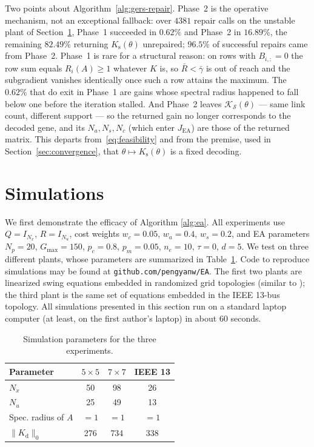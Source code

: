 \documentclass[letterpaper, 10pt, conference]{ieeeconf}
\begin{document}
Two points about Algorithm~\ref{alg:gers-repair}. Phase~2 is the operative
mechanism, not an exceptional fallback: over $4381$ repair calls on the unstable
plant of Section~\ref{sec:simulations}, Phase~1 succeeded in $0.62\%$ and
Phase~2 in $16.89\%$, the remaining $82.49\%$ returning $K_\mathrm{s}(\theta)$
unrepaired; $96.5\%$ of successful repairs came from Phase~2. Phase~1 is rare for a
structural reason: on rows with $B_{i,:}=0$ the row sum equals $R_i(A)\ge 1$
whatever $K$ is, so $\bar{R}<\bar{\gamma}$ is out of reach and the subgradient
vanishes identically once such a row attains the maximum. The $0.62\%$ that do
exit in Phase~1 are gains whose spectral radius happened to fall below one
before the iteration stalled. And Phase~2 leaves
$\mathcal{K}_{\mathcal{S}}(\theta)$ --- same link count, different support --- so
the returned gain no longer corresponds to the decoded gene, and its
$N_a,N_s,N_c$ (which enter $J_\mathrm{EA}$) are those of the returned matrix.
This departs from~\eqref{eq:feasibility} and from the premise, used in
Section~\ref{sec:convergence}, that $\theta\mapsto K_\mathrm{s}(\theta)$ is a
fixed decoding.

\section{Simulations} \label{sec:simulations}
We first demonstrate the efficacy of Algorithm \ref{alg:ea}. All experiments use $Q = I_{N_x}$, $R = I_{N_u}$, cost weights $w_c = 0.05$, $w_a = 0.4$, $w_s = 0.2$, and EA parameters $N_p = 20$, $G_{\max} = 150$, $p_c = 0.8$,
$p_m = 0.05$, $n_e = 10$, $\tau = 0$, $d = 5$. We test on three different plants, whose parameters are summarized in Table~\ref{tab:sim_params}. Code to reproduce simulations may be found at \texttt{github.com/pengyanw/EA}. The first two plants are linearized swing equations embedded in randomized grid topologies (similar to \cite{anderson2019system}); the third plant is the same set of equations embedded in the IEEE 13-bus topology. All simulations presented in this section run on a standard laptop computer (at least, on the first author's laptop) in about  60 seconds.
\begin{table}[h]
\centering
\caption{Simulation parameters for the three experiments.}
\label{tab:sim_params}
\begin{tabular}{lccc}
\hline
\textbf{Parameter} & \textbf{$5\!\times\!5$} & \textbf{$7\!\times\!7$}
                   & \textbf{IEEE 13} \\
\hline
$N_x$              & 50   & 98   & 26  \\
$N_u$              & 25   & 49   & 13  \\
Spec. radius of $A$& $=1$ & $=1$ & $=1$ \\
$\|K_\mathrm{d}\|_0$ & 276 & 734 & 338 \\
\hline
\end{tabular}
\end{table}
\end{document}
